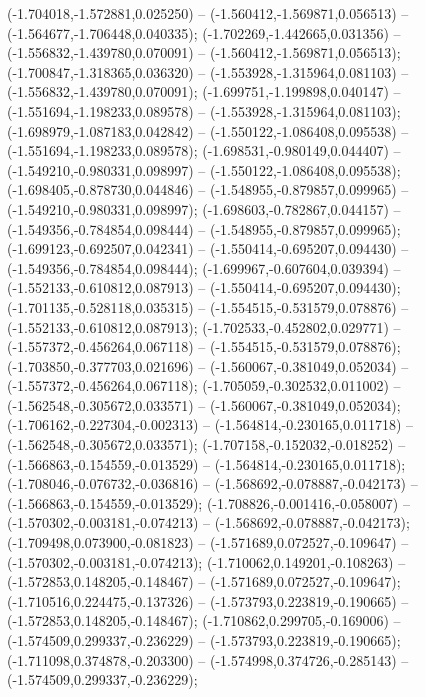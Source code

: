  (-1.704018,-1.572881,0.025250) -- (-1.560412,-1.569871,0.056513) -- (-1.564677,-1.706448,0.040335);
 (-1.702269,-1.442665,0.031356) -- (-1.556832,-1.439780,0.070091) -- (-1.560412,-1.569871,0.056513);
 (-1.700847,-1.318365,0.036320) -- (-1.553928,-1.315964,0.081103) -- (-1.556832,-1.439780,0.070091);
 (-1.699751,-1.199898,0.040147) -- (-1.551694,-1.198233,0.089578) -- (-1.553928,-1.315964,0.081103);
 (-1.698979,-1.087183,0.042842) -- (-1.550122,-1.086408,0.095538) -- (-1.551694,-1.198233,0.089578);
 (-1.698531,-0.980149,0.044407) -- (-1.549210,-0.980331,0.098997) -- (-1.550122,-1.086408,0.095538);
 (-1.698405,-0.878730,0.044846) -- (-1.548955,-0.879857,0.099965) -- (-1.549210,-0.980331,0.098997);
 (-1.698603,-0.782867,0.044157) -- (-1.549356,-0.784854,0.098444) -- (-1.548955,-0.879857,0.099965);
 (-1.699123,-0.692507,0.042341) -- (-1.550414,-0.695207,0.094430) -- (-1.549356,-0.784854,0.098444);
 (-1.699967,-0.607604,0.039394) -- (-1.552133,-0.610812,0.087913) -- (-1.550414,-0.695207,0.094430);
 (-1.701135,-0.528118,0.035315) -- (-1.554515,-0.531579,0.078876) -- (-1.552133,-0.610812,0.087913);
 (-1.702533,-0.452802,0.029771) -- (-1.557372,-0.456264,0.067118) -- (-1.554515,-0.531579,0.078876);
 (-1.703850,-0.377703,0.021696) -- (-1.560067,-0.381049,0.052034) -- (-1.557372,-0.456264,0.067118);
 (-1.705059,-0.302532,0.011002) -- (-1.562548,-0.305672,0.033571) -- (-1.560067,-0.381049,0.052034);
 (-1.706162,-0.227304,-0.002313) -- (-1.564814,-0.230165,0.011718) -- (-1.562548,-0.305672,0.033571);
 (-1.707158,-0.152032,-0.018252) -- (-1.566863,-0.154559,-0.013529) -- (-1.564814,-0.230165,0.011718);
 (-1.708046,-0.076732,-0.036816) -- (-1.568692,-0.078887,-0.042173) -- (-1.566863,-0.154559,-0.013529);
 (-1.708826,-0.001416,-0.058007) -- (-1.570302,-0.003181,-0.074213) -- (-1.568692,-0.078887,-0.042173);
 (-1.709498,0.073900,-0.081823) -- (-1.571689,0.072527,-0.109647) -- (-1.570302,-0.003181,-0.074213);
 (-1.710062,0.149201,-0.108263) -- (-1.572853,0.148205,-0.148467) -- (-1.571689,0.072527,-0.109647);
 (-1.710516,0.224475,-0.137326) -- (-1.573793,0.223819,-0.190665) -- (-1.572853,0.148205,-0.148467);
 (-1.710862,0.299705,-0.169006) -- (-1.574509,0.299337,-0.236229) -- (-1.573793,0.223819,-0.190665);
 (-1.711098,0.374878,-0.203300) -- (-1.574998,0.374726,-0.285143) -- (-1.574509,0.299337,-0.236229);
